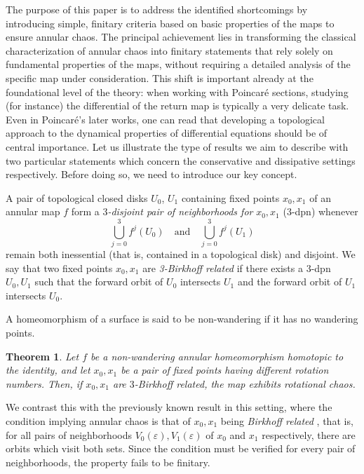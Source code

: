 \documentclass[12pt,a4paper]{amsart}
\newtheorem*{thm*}{Theorem}
\theoremstyle{definition}
\theoremstyle{remark}
\begin{document}
The purpose of this paper is to address the identified shortcomings by introducing simple, finitary criteria based on basic  properties of the maps to ensure annular chaos. The principal achievement lies in transforming the classical characterization of annular chaos into finitary statements that rely solely on fundamental properties of the maps, without requiring a detailed analysis of the specific map under consideration. This shift is important already at the foundational level of the theory: when working with Poincaré sections, studying (for instance) the differential of the return map is typically a very delicate task. Even in Poincaré’s later works, one can read that developing a topological approach to the dynamical properties of differential equations should be of central importance. 
Let us illustrate the type of results we aim to describe with two particular statements which concern the conservative and dissipative settings respectively. Before doing so, 
we need to introduce our key concept. 

\smallskip

A pair of topological closed disks $U_0$, $U_1$ containing fixed points  $x_0,x_1$ of an annular map $f$
form a \emph{$3$-disjoint pair of neighborhoods for} $x_0, x_1$ ($3$-dpn) whenever 
\[
\bigcup_{j=0}^{3} f^j(U_0) \quad \text{and} \quad \bigcup_{j=0}^{3} f^j(U_1)
\]
remain both inessential (that is, contained in a topological disk) and disjoint. We say that two fixed points $x_0,x_1$  are \emph{3-Birkhoff related} if there exists a $3$-dpn $U_0, U_1$ such that the forward orbit of $U_0$ intersects $U_1$ and the forward orbit of $U_1$ intersects $U_0$.

A homeomorphism of a surface is said to be non-wandering if it has no wandering points.


\begin{thm*}

Let $f$ be a non-wandering annular homeomorphism homotopic to the identity,
and let $x_0,x_1$ be a pair of fixed points having different rotation numbers.
Then, if $x_0,x_1$ are $3$-Birkhoff related, the map exhibits rotational chaos.

\end{thm*}


We contrast this with the previously known result in this setting, where the condition implying annular chaos is that of
$x_0,x_1$ being \emph{Birkhoff related} \cite{forcing}, that is, for all pairs of neighborhoods $V_0(\varepsilon),V_1(\varepsilon)$ of $x_0$ and $x_1$ respectively, there are orbits which visit  both sets. Since the condition must be verified for every pair of neighborhoods, the property fails to be finitary.
\end{document}
